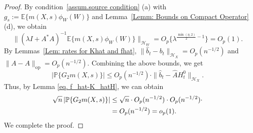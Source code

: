 \documentclass[
  12pt]{article}
\begin{document}
\begin{proof}
By condition~\ref{assum.source condition} (a) with $g_s:=\mathbb{E}\{m(X,s)\phi_W(W)\}$ and Lemma~\ref{Lemm: Bounds on Compact Operator} (d), we obtain
$$
\|( \lambda I+A^*A )^{-1}\mathbb{E}\{m(X,s)\phi_W(W)\}\|_{\mathcal{H}_W} = O_p\{\lambda^{\frac{\min(\eta,2)}{2}-1}\}=O_p(1).
$$
By Lemmas~\ref{Lem: rates for Khat and fhat}, $\|\widehat{b}_t-b_t\|_{\mathcal{H}_X}=O_p(n^{-1/2})$ and $\|\widehat{A}-A\|_{\mathrm{op}}=O_p(n^{-1/2})$. Combining the above bounds, we get
\begin{equation}\label{eq: G2-front}
    \left|\mathbb{P}\{ G_2m(X,s)\}\right|\le O_p(n^{-1/2})\cdot \|\widehat{b}_t-\widehat{A}H^0_t\|_{\mathcal{H}_X}.
\end{equation}
Thus, by Lemma \ref{eq. f_hat-K_hatH}, we can obtain
\begin{align}\label{eq: G2}
\sqrt{n}\left|\mathbb{P}\{ G_2m(X,s)\}\right|
&\le \sqrt{n}\cdot O_p(n^{-1/2})\cdot O_p(n^{-1/2}) \cdot\notag\\
&= O_p(n^{-1/2})=o_p(1).
\end{align}
We complete the proof.
\end{proof}
\end{document}
